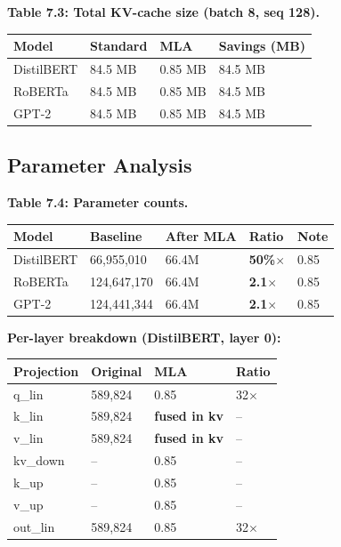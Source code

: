 \textbf{Table 7.3: Total KV-cache size (batch 8, seq 128).}

\begin{table}[H]
\centering
\small
\begin{tabular}{llll}
\toprule
\textbf{Model} & \textbf{Standard} & \textbf{MLA} & \textbf{Savings (MB)} \\
\midrule
DistilBERT & 84.5 MB & 0.85 MB & 84.5 MB \\
RoBERTa & 84.5 MB & 0.85 MB & 84.5 MB \\
GPT-2 & 84.5 MB & 0.85 MB & 84.5 MB \\
\bottomrule
\end{tabular}
\end{table}

\subsection{Parameter Analysis}

\textbf{Table 7.4: Parameter counts.}

\begin{table}[H]
\centering
\small
\begin{tabular}{lllll}
\toprule
\textbf{Model} & \textbf{Baseline} & \textbf{After MLA} & \textbf{Ratio} & \textbf{Note} \\
\midrule
DistilBERT & 66,955,010 & 66.4M & \textbf{50\%$\times$} & 0.85 \\
RoBERTa & 124,647,170 & 66.4M & \textbf{2.1$\times$} & 0.85 \\
GPT-2 & 124,441,344 & 66.4M & \textbf{2.1$\times$} & 0.85 \\
\bottomrule
\end{tabular}
\end{table}

\textbf{Per-layer breakdown (DistilBERT, layer 0):}

\begin{table}[H]
\centering
\small
\begin{tabular}{llll}
\toprule
\textbf{Projection} & \textbf{Original} & \textbf{MLA} & \textbf{Ratio} \\
\midrule
q\_lin & 589,824 & 0.85 & 32$\times$ \\
k\_lin & 589,824 & \textbf{fused in kv} & -- \\
v\_lin & 589,824 & \textbf{fused in kv} & -- \\
kv\_down & -- & 0.85 & -- \\
k\_up & -- & 0.85 & -- \\
v\_up & -- & 0.85 & -- \\
out\_lin & 589,824 & 0.85 & 32$\times$ \\
\bottomrule
\end{tabular}
\end{table}

